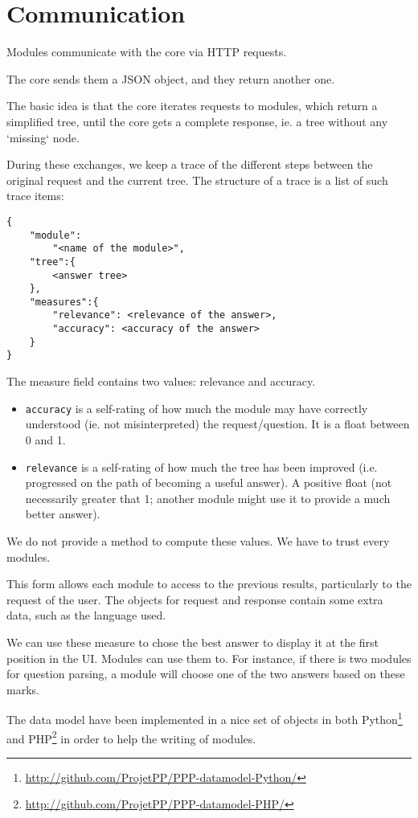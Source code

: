 \section{Communication}

Modules communicate with the core via HTTP requests.

The core sends them a JSON object, and they return another one.

The basic idea is that the core iterates requests to modules, which return a simplified tree, until the core gets a complete response, ie. a tree without any `missing` node.

During these exchanges, we keep a trace of the different steps between the original request and the current tree. The structure of a trace is a list of such trace items:
\begin{verbatim}
{
    "module":
        "<name of the module>", 
    "tree":{
        <answer tree>
    },
    "measures":{
        "relevance": <relevance of the answer>,
        "accuracy": <accuracy of the answer>
    }
}
\end{verbatim}

The measure field contains two values: relevance and accuracy.

\begin{itemize}
    \item \texttt{accuracy} is a self-rating of how much the module may have correctly understood (ie. not misinterpreted) the request/question. It is a float between 0 and 1.
    \item \texttt{relevance} is a self-rating of how much the tree has been improved (i.e. progressed on the path of becoming a useful answer). A positive float (not necessarily greater that 1; another module might use it to provide a much better answer).
\end{itemize}

We do not provide a method to compute these values. We have to trust every modules.

This form allows each module to access to the previous results, particularly to the request of the user. The objects for request and response contain some extra data, such as the language used.

We can use these measure to chose the best answer to display it at the first position in the UI. Modules can use them to. For instance, if there is two modules for question parsing, a module will choose one of the two answers based on these marks.

The data model have been implemented in a nice set of objects in both Python\footnote{\url{http://github.com/ProjetPP/PPP-datamodel-Python/}} and PHP\footnote{\url{http://github.com/ProjetPP/PPP-datamodel-PHP/}} in order to help the writing of modules.

